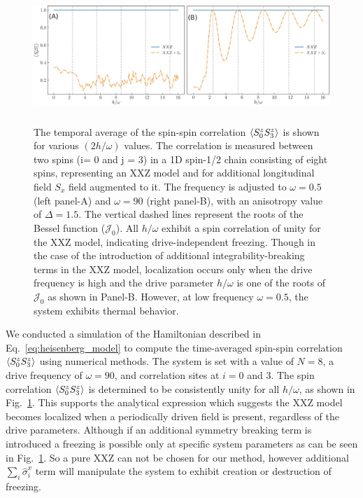 \documentclass[aps,prb,reprint,showpacs,floatfix,superscriptaddress, onecolumn, nofootinbib, 9pt]{revtex4-2}
\begin{document}
\begin{enumerate}
{	\begin{figure}[t!]
		\includegraphics[height=5cm]{xxz_sx_low_high_fr.jpeg}
		\caption{The temporal average of the spin-spin correlation $\expval{S^z_0 S^z_3}$ is shown for various $(2h/\omega)$ values. The correlation is measured between two spins (i= 0 and j = 3) in a 1D spin-1/2 chain consisting of eight spins, representing an XXZ model and for additional longitudinal field $S_x$ field augmented to it. The frequency is adjusted to $\omega=0.5$ (left panel-A) and $\omega=90$ (right panel-B), with an anisotropy value of $\Delta=1.5$. The vertical dashed lines represent the roots of the Bessel function ($\mathcal{J}_0$). All $h/\omega$ exhibit a spin correlation of unity for the XXZ model, indicating drive-independent freezing. Though in the case of the introduction of additional integrability-breaking terms in the XXZ model, localization occurs only when the drive frequency is high and the drive parameter $h/\omega$ is one of the roots of $\mathcal{J}_0$ as shown in Panel-B. However, at low frequency $\omega=0.5$, the system exhibits thermal behavior.}
		\label{fig:xxz}
	\end{figure}

	We conducted a simulation of the Hamiltonian described in Eq.~\eqref{eq:heisenberg_model} to compute the time-averaged spin-spin correlation $\expval{S^z_0 S^z_3}$ using numerical methods. The system is set with a value of $N=8$, a drive frequency of $\omega=90$, and correlation sites at $i=0$ and $3$. The spin correlation $\expval{S^z_0 S^z_3}$ is determined to be consistently unity for all $h/\omega$, as shown in Fig.~\ref{fig:xxz}. This supports the analytical expression which suggests the XXZ model becomes localized when a periodically driven field is present, regardless of the drive parameters. Although if an additional symmetry breaking term is introduced a freezing is possible only at specific system parameters as can be seen in Fig.~\ref{fig:xxz}. So a pure XXZ can not be chosen for our method, however additional $\sum_i \hat{\sigma}^x_{i}$ term will manipulate the system to exhibit creation or destruction of freezing.
	}
	\end{enumerate}
	
\end{document}
